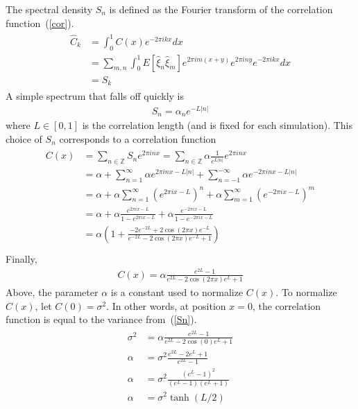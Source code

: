 The spectral density $S_n$ is defined as the Fourier transform of the
correlation function~(\ref{cor}).
\begin{align*}
\begin{split}
\hat{C}_k &= \int_{0}^{1}C(x)e^{-2\pi ikx}dx\\
&= \sum_{m,n} \int_{0}^{1} E[\hat{\xi}_n\hat{\xi}_m] e^{2\pi
  im(x+y)}e^{2\pi iny}e^{-2\pi ikx}dx\\
&=S_k
\end{split}
\end{align*}
A simple spectrum that falls off quickly is
\begin{align}\label{spec}
S_n=\alpha_n e^{-L|n|}
\end{align}
where $L \in [0,1]$ is the correlation length (and is fixed
for each simulation). This choice of $S_n$ corresponds to a correlation function
\begin{align}
\begin{split}
C(x) &= \sum_{n\in \mathbb{Z}}S_ne^{2\pi inx}=\sum_{n\in \mathbb{Z}}\alpha \frac{1}{e^{L|n|}}e^{2\pi inx}\\
&= \alpha + \sum_{n=1}^{\infty}\alpha e^{2\pi
  inx-L|n|}+\sum_{n=-1}^{-\infty}\alpha e^{-2\pi inx-L|n|}\\
&= \alpha+\alpha \sum_{n=1}^{\infty}(e^{2\pi ix-L})^n+\alpha \sum_{m=1}^{\infty}(e^{-2\pi ix-L})^m\\
&=\alpha + \alpha \frac{e^{2\pi ix-L}}{1-e^{2\pi ix-L}} +\alpha
\frac{e^{-2\pi ix-L}}{1-e^{-2\pi ix-L}}\\
&=\alpha \left(1+ \frac{-2e^{-2L}+2\cos(2\pi x)e^{-L}}{e^{-2L}-2\cos(2\pi x)e^{-L}+1} \right)\\
\end{split}
\end{align}
Finally,
\begin{align}\label{cx}
C(x)= \alpha \frac{e^{2L}-1}{e^{2L}-2\cos(2\pi x)e^L+1}
\end{align}
Above, the parameter $\alpha$ is a constant used to normalize $C(x)$. To normalize $C(x)$,
let $C(0)=\sigma^2$. In other words, at position $x=0$, the
correlation function is equal to the variance from~(\ref{Sn}).
\begin{align}
\begin{split}\label{a}
\sigma^2&= \alpha \frac{e^{2L}-1}{e^{2L}-2\cos(0)e^L+1}\\
\alpha &=\sigma^2 \frac{e^{2L}-2e^{L} +1}{e^{2L}-1}\\
\alpha &=\sigma^2
\frac{(e^{L}-1)^2}{(e^{L}-1)(e^{L}+1)}\\
\alpha &= \sigma^2 \tanh(L/2)
\end{split}
\end{align}
